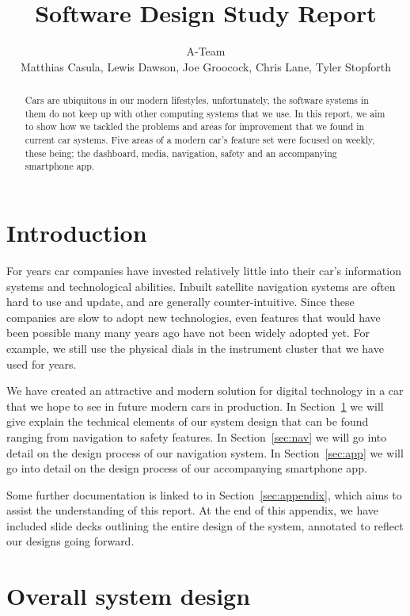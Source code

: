 \documentclass{article}
\title{Software Design Study Report}
\author{A-Team\\Matthias Casula, Lewis Dawson, Joe Groocock, Chris Lane, Tyler Stopforth}
\begin{document}
\maketitle


\begin{abstract}
  Cars are ubiquitous in our modern lifestyles, unfortunately, the software systems in them do not keep up with other computing systems that we use. In this report, we aim to show how we tackled the problems and areas for improvement that we found in current car systems. Five areas of a modern car's feature set were focused on weekly, these being; the dashboard, media, navigation, safety and an accompanying smartphone app.
\end{abstract}


\section*{Introduction}
For years car companies have invested relatively little into their car's information systems and technological abilities. Inbuilt satellite navigation systems are often hard to use and update, and are generally counter-intuitive. Since these companies are slow to adopt new technologies, even features that would have been possible many many years ago have not been widely adopted yet. For example, we still use the physical dials in the instrument cluster that we have used for years.

We have created an attractive and modern solution for digital technology in a car that we hope to see in future modern cars in production. In Section~\ref{sec:system-design} we will give explain the technical elements of our system design that can be found ranging from navigation to safety features. In Section~\ref{sec:nav} we will go into detail on the design process of our navigation system. In Section~\ref{sec:app} we will go into detail on the design process of our accompanying smartphone app.

Some further documentation is linked to in Section~\ref{sec:appendix}, which aims to assist the understanding of this report. At the end of this appendix, we have included slide decks outlining the entire design of the system, annotated to reflect our designs going forward.

\section{Overall system design}\label{sec:system-design}
\end{document}
